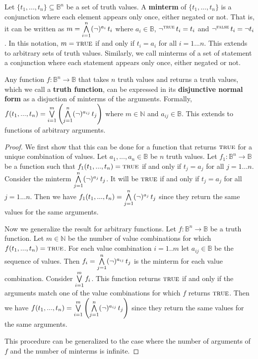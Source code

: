 \documentclass[11pt,letterpaper,fleqn]{memoir} %
\begin{document}
\begin{mathSection}
	\begin{defn}\label{def_minterm}
		Let $\{t_1, ..., t_n\} \subseteq \mathbb{B}^n$ be a set of truth values. A \textbf{minterm} of $\{t_1, ..., t_n\}$ is a conjunction where each element appears only once, either negated or not. That is, it can be written as $m = \bigwedge \limits_{i=1}^n (\neg)^{a_{i}} \, t_i$ where $a_{i} \in \mathbb{B}$, $\neg ^ {\textsc{true}} \, t_i = t_i$ and $\neg ^ {\textsc{false}} \, t_i = \neg t_i$. In this notation, $m = \textsc{true}$ if and only if $t_i = a_i$ for all $i=1...n$. This extends to arbitrary sets of truth values. Similarly, we call minterms of a set of statement a conjunction where each statement appears only once, either negated or not.
	\end{defn}
	
	\begin{prop}\label{prop_disjunctive_normal_form}
		Any function $f : \mathbb{B}^n \to \mathbb{B}$ that takes $n$ truth values and returns a truth values, which we call a \textbf{truth function}, can be expressed in its \textbf{disjunctive normal form} as a disjuction of minterms of the arguments. Formally, $f(t_1, ..., t_n) =\bigvee \limits_{i=1}^m \left( \bigwedge \limits_{j=1}^n (\neg)^{a_{ij}} \, t_j \right)$ where $m \in \mathbb{N}$ and  $a_{ij} \in \mathbb{B}$. This extends to functions of arbitrary arguments.
	\end{prop}
	\begin{proof}
		We first show that this can be done for a function that returns $\textsc{true}$ for a unique combination of values. Let $a_1, ..., a_n \in \mathbb{B}$ be $n$ truth values. Let $f_1: \mathbb{B}^n \to \mathbb{B}$ be a function such that $f_1(t_1, ..., t_n) = \textsc{true}$ if and only if $t_j = a_j$ for all $j=1...n$. Consider the minterm $\bigwedge \limits_{j=1}^n (\neg)^{a_{j}} \, t_j$. It will be $\textsc{true}$ if and only if $t_j \equal a_j$ for all $j=1...n$. Then we have $f_1(t_1, ..., t_n) = \bigwedge \limits_{j=1}^n (\neg)^{a_{j}} \, t_j$ since they return the same values for the same arguments.
		
		Now we generalize the result for arbitrary functions. Let $f : \mathbb{B}^n \to \mathbb{B}$ be a truth function. Let $m \in \mathbb{N}$ be the number of value combinations for which $f(t_1, ..., t_n) = \textsc{true}$. For each value combination $i=1..m$ let $a_{ij} \in \mathbb{B}$ be the sequence of values. Then $f_i = \bigwedge \limits_{j=1}^n (\neg)^{a_{ij}} \, t_j$ is the minterm for each value combination. Consider $\bigvee \limits_{i=1}^m f_i$. This function returns $\textsc{true}$ if and only if the arguments match one of the value combinations for which $f$ returns $\textsc{true}$. Then we have $f(t_1, ..., t_n) =\bigvee \limits_{i=1}^m \left( \bigwedge \limits_{j=1}^n (\neg)^{a_{ij}} \, t_j \right)$ since they return the same values for the same arguments.
		
		This procedure can be generalized to the case where the number of arguments of $f$ and the number of minterms is infinite.
	\end{proof}
\end{mathSection}
\end{document}
